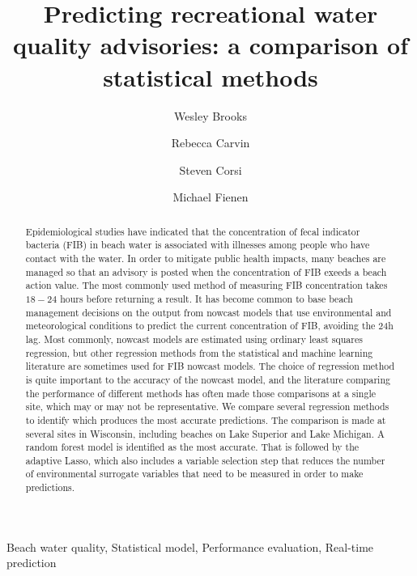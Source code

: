 \documentclass[authoryear,review, 12pt]{elsarticle}
\date{}
\begin{document}
\begin{frontmatter}

\title{Predicting recreational water quality advisories: a comparison of statistical methods}

\author[usgs-wiwsc]{Wesley Brooks}

\author[usgs-wiwsc]{Rebecca Carvin}

\author[usgs-wiwsc]{Steven Corsi}

\author[usgs-wiwsc]{Michael Fienen}

\address[usgs-wiwsc]{Wisconsin Water Science Center, United States Geological Survey, 8505 Research Way, Middleton, WI 53562}

\begin{abstract}
Epidemiological studies have indicated that the concentration of fecal indicator bacteria (FIB) in beach water is associated with illnesses among people who have contact with the water. In order to mitigate public health impacts, many beaches are managed so that an advisory is posted when the concentration of FIB exeeds a beach action value. The most commonly used method of measuring FIB concentration takes $18 - 24$ hours before returning a result. It has become common to base beach management decisions on the output from nowcast models that use environmental and meteorological conditions to predict the current concentration of FIB, avoiding the 24h lag. Most commonly, nowcast models are estimated using ordinary least squares regression, but other regression methods from the statistical and machine learning literature are sometimes used for FIB nowcast models. The choice of regression method is quite important to the accuracy of the nowcast model, and the literature comparing the performance of different methods has often made those comparisons at a single site, which may or may not be representative. We compare several regression methods to identify which produces the most accurate predictions. The comparison is made at several sites in Wisconsin, including beaches on Lake Superior and Lake Michigan. A random forest model is identified as the most accurate. That is followed by the adaptive Lasso, which also includes a variable selection step that reduces the number of environmental surrogate variables that need to be measured in order to make predictions.
\end{abstract}

\begin{keyword}
Beach water quality, Statistical model, Performance evaluation, Real-time prediction
\end{keyword}

\end{frontmatter}
\end{document}
